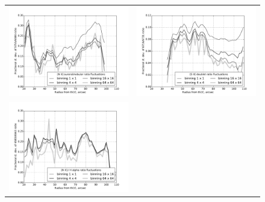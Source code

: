 \documentclass[preprint]{aastex}
\begin{document}
\begin{figure}[p]
  \begin{tabular}{ll}
    \includegraphics{sigma-rnii-vs-radius-binning-new} &
    \includegraphics{sigma-rsii-vs-radius-binning-new} \\
    \includegraphics{sigma-rnii-ha-vs-radius-binning-new} &

\end{tabular}
\end{figure}
\end{document}
